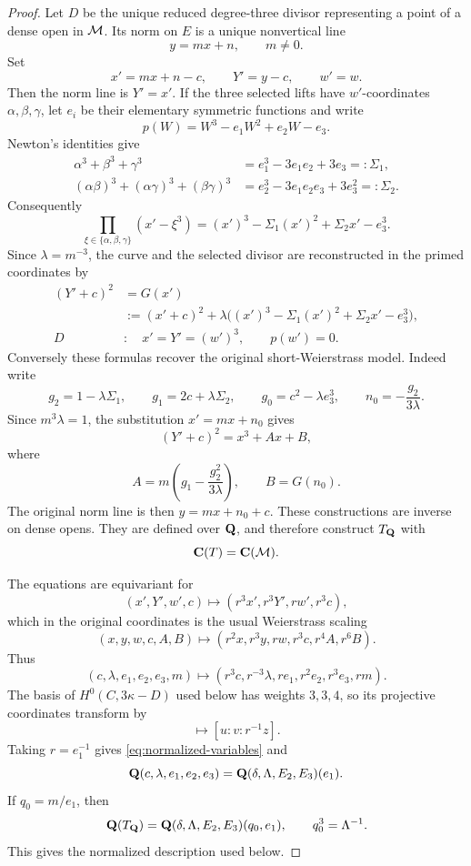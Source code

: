 \begin{proof}
Let $D$ be the unique reduced degree-three divisor representing a point of a
dense open in $\mathcal M$.  Its norm on $E$ is a unique nonvertical line
\[
 y=mx+n,
 \qquad m\ne0.
\]
Set
\[
 x'=mx+n-c,
 \qquad
 Y'=y-c,
 \qquad
 w'=w.
\]
Then the norm line is $Y'=x'$.  If the three selected lifts have
$w'$-coordinates $\alpha,\beta,\gamma$, let $e_i$ be their elementary
symmetric functions and write
\[
 p(W)=W^3-e_1W^2+e_2W-e_3.
\]
Newton's identities give
\[
 \begin{aligned}
 \alpha^3+\beta^3+\gamma^3
   &=e_1^3-3e_1e_2+3e_3=: \Sigma_1,\\
 (\alpha\beta)^3+(\alpha\gamma)^3+(\beta\gamma)^3
   &=e_2^3-3e_1e_2e_3+3e_3^2=: \Sigma_2.
 \end{aligned}
\]
Consequently
\[
 \prod_{\xi\in\{\alpha,\beta,\gamma\}}(x'-\xi^3)
 =(x')^3-\Sigma_1(x')^2+\Sigma_2x'-e_3^3.
\]
Since $\lambda=m^{-3}$, the curve and the selected divisor are reconstructed
in the primed coordinates by
\begin{equation}
 \begin{aligned}
 (Y'+c)^2
   &=G(x')\\
   &:=(x'+c)^2+\lambda\bigl((x')^3-\Sigma_1(x')^2
                  +\Sigma_2x'-e_3^3\bigr),\\
 D&:\quad x'=Y'=(w')^3,\qquad p(w')=0.
 \end{aligned}
\label{eq:chart-curve-divisor}
\end{equation}
Conversely these formulas recover the original short-Weierstrass model.
Indeed write
\[
 g_2=1-\lambda\Sigma_1,
 \qquad
 g_1=2c+\lambda\Sigma_2,
 \qquad
 g_0=c^2-\lambda e_3^3,
 \qquad
 n_0=-\frac{g_2}{3\lambda}.
\]
Since $m^3\lambda=1$, the substitution $x'=mx+n_0$ gives
\[
 (Y'+c)^2=x^3+Ax+B,
\]
where
\[
 A=m\left(g_1-\frac{g_2^2}{3\lambda}\right),
 \qquad
 B=G(n_0).
\]
The original norm line is then $y=mx+n_0+c$.  These constructions are
inverse on dense opens.  They are defined over $\mathbf Q$, and therefore
construct $T_{\mathbf Q}$ with
\begin{equation}
 \mathbf C(T)=\mathbf C(\mathcal M).
\label{eq:chart-function-field}
\end{equation}

The equations are equivariant for
\[
 (x',Y',w',c)\longmapsto(r^3x',r^3Y',rw',r^3c),
\]
which in the original coordinates is the usual Weierstrass scaling
\[
 (x,y,w,c,A,B)
 \longmapsto
 (r^2x,r^3y,rw,r^3c,r^4A,r^6B).
\]
Thus
\[
 (c,\lambda,e_1,e_2,e_3,m)
 \longmapsto
 (r^3c,r^{-3}\lambda,re_1,r^2e_2,r^3e_3,rm).
\]
The basis of $H^0(C,3\kappa-D)$ used below has weights $3,3,4$, so its
projective coordinates transform by
\begin{equation}
 [u:v:z]\longmapsto[u:v:r^{-1}z].
\label{eq:section-scaling}
\end{equation}
Taking $r=e_1^{-1}$ gives \eqref{eq:normalized-variables} and
\[
 \mathbf Q(c,\lambda,e_1,e_2,e_3)
 =\mathbf Q(\delta,\Lambda,E_2,E_3)(e_1).
\]
If $q_0=m/e_1$, then
\begin{equation}
 \mathbf Q(T_{\mathbf Q})
 =\mathbf Q(\delta,\Lambda,E_2,E_3)(q_0,e_1),
 \qquad q_0^3=\Lambda^{-1}.
\label{eq:cubic-chart-field}
\end{equation}
This gives the normalized description used below.
\end{proof}


